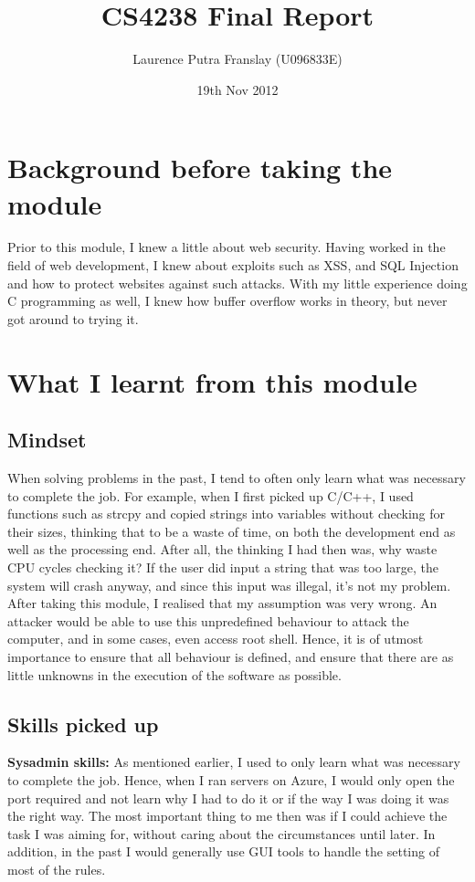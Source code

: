 \documentclass[12pt]{article}
\begin{document}
\title{CS4238 Final Report}
\author{Laurence Putra Franslay (U096833E)}
\date{19th Nov 2012}
\maketitle

\section{Background before taking the module}
Prior to this module, I knew a little about web security. Having worked in the field of web development, I knew about exploits such as XSS, and SQL Injection and how to protect websites against such attacks. With my little experience doing C programming as well, I knew how buffer overflow works in theory, but never got around to trying it.

\section{What I learnt from this module}
\subsection{Mindset}
When solving problems in the past, I tend to often only learn what was necessary to complete the job. For example, when I first picked up C/C++, I used functions such as strcpy and copied strings into variables without checking for their sizes, thinking that to be a waste of time, on both the development end as well as the processing end. After all, the thinking I had then was, why waste CPU cycles checking it? If the user did input a string that was too large, the system will crash anyway, and since this input was illegal, it's not my problem. \\

After taking this module, I realised that my assumption was very wrong. An attacker would be able to use this unpredefined behaviour to attack the computer, and in some cases, even access root shell. Hence, it is of utmost importance to ensure that all behaviour is defined, and ensure that there are as little unknowns in the execution of the software as possible. \\

\subsection{Skills picked up}
\textbf{Sysadmin skills:} As mentioned earlier, I used to only learn what was necessary to complete the job. Hence, when I ran servers on Azure, I would only open the port required and not learn why I had to do it or if the way I was doing it was the right way. The most important thing to me then was if I could achieve the task I was aiming for, without caring about the circumstances until later. In addition, in the past I would generally use GUI tools to handle the setting of most of the rules. \\
\end{document}
